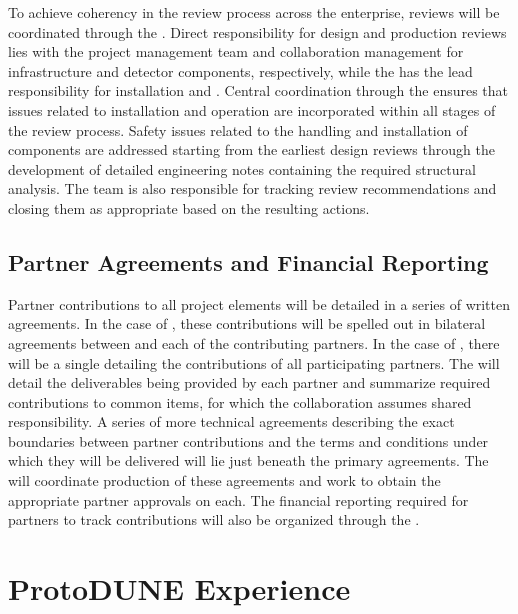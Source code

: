 To achieve coherency in the review process across the 
enterprise, reviews will be coordinated through the .
Direct responsibility for design and production reviews lies with the
 project management team and  collaboration
management for infrastructure and detector components, respectively,
while the  has the lead responsibility for installation and
.  Central coordination through the
 ensures that issues related to installation and operation
are incorporated within all stages of the review process.  Safety
issues related to the handling and installation of components are
addressed starting from the earliest design reviews through the
development of detailed engineering notes containing the required
structural analysis.  The  team is also responsible for
tracking review recommendations and closing them as appropriate based
on the resulting actions.

\subsection{Partner Agreements and Financial Reporting}
\label{sec:dune_agreements}

Partner contributions to all project elements will be detailed in a
series of written agreements.  In the case of , these
contributions will be spelled out in bilateral agreements between
 and each of the contributing partners.  In the case of
, there will be a single  
detailing the contributions of all participating partners.  The  
will detail the deliverables being provided by each partner and
summarize required contributions to common items, for which the
collaboration assumes shared responsibility.  A series of more
technical agreements describing the exact boundaries between partner
contributions and the terms and conditions under which they will be
delivered will lie just beneath the primary agreements.  The
 will coordinate production of these agreements and work to
obtain the appropriate partner approvals %
on each.  The financial
reporting required for partners to track  contributions
will also be organized through the .

\section{ProtoDUNE Experience}
\label{sec:dune_protodune}

